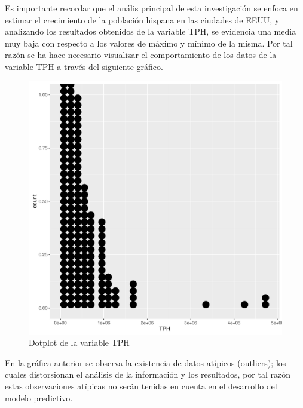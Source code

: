 \documentclass[conference]{IEEEtran}\usepackage[]{graphicx}\usepackage[]{color}
\makeatletter
\def\maxwidth{ %
  \ifdim\Gin@nat@width>\linewidth
    \linewidth
  \else
    \Gin@nat@width
  \fi
}
\newenvironment{knitrout}{}{} %
\makeatother
\begin{document}
Es importante recordar que el anális principal de esta investigación se enfoca en estimar el crecimiento de la población hispana en las ciudades de EEUU, y analizando los resultados obtenidos de la variable TPH, se evidencia una media muy baja con respecto a los valores de máximo y mínimo de la misma.  Por tal razón se ha hace necesario visualizar el comportamiento de los datos de la variable TPH a través del siguiente gráfico.   
\vspace{-6mm}
\begin{figure}[H]
	\centering
\begin{knitrout}
\color{fgcolor}
\includegraphics[width=\maxwidth]{figure/conatipicos-1} 

\end{knitrout}
	\caption{Dotplot de la variable TPH}
\end{figure}
\vspace{-10mm}
En la gráfica anterior se observa la existencia de datos atípicos (outliers); los cuales distorsionan el análisis de la información y los resultados, por tal razón estas observaciones atípicas no serán tenidas en cuenta en el desarrollo del modelo predictivo.
\vspace{-6mm}
\end{document}
